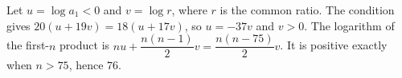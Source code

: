 Let $u=\log a_1<0$ and $v=\log r$, where $r$ is the common ratio. The condition gives $20(u+19v)=18(u+17v)$, so $u=-37v$ and $v>0$. The logarithm of the first-$n$ product is $nu+\dfrac{n(n-1)}{2}v=\dfrac{n(n-75)}{2}v$. It is positive exactly when $n>75$, hence $\boxed{76}$.

